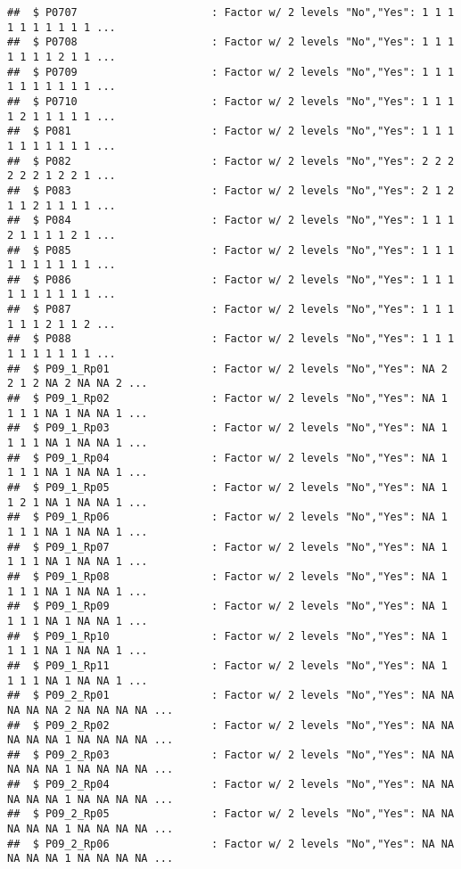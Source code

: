 \documentclass[
]{article}
\begin{document}
\begin{verbatim}
##  $ P0707                     : Factor w/ 2 levels "No","Yes": 1 1 1 1 1 1 1 1 1 1 ...
##  $ P0708                     : Factor w/ 2 levels "No","Yes": 1 1 1 1 1 1 1 2 1 1 ...
##  $ P0709                     : Factor w/ 2 levels "No","Yes": 1 1 1 1 1 1 1 1 1 1 ...
##  $ P0710                     : Factor w/ 2 levels "No","Yes": 1 1 1 1 2 1 1 1 1 1 ...
##  $ P081                      : Factor w/ 2 levels "No","Yes": 1 1 1 1 1 1 1 1 1 1 ...
##  $ P082                      : Factor w/ 2 levels "No","Yes": 2 2 2 2 2 2 1 2 2 1 ...
##  $ P083                      : Factor w/ 2 levels "No","Yes": 2 1 2 1 1 2 1 1 1 1 ...
##  $ P084                      : Factor w/ 2 levels "No","Yes": 1 1 1 2 1 1 1 1 2 1 ...
##  $ P085                      : Factor w/ 2 levels "No","Yes": 1 1 1 1 1 1 1 1 1 1 ...
##  $ P086                      : Factor w/ 2 levels "No","Yes": 1 1 1 1 1 1 1 1 1 1 ...
##  $ P087                      : Factor w/ 2 levels "No","Yes": 1 1 1 1 1 1 2 1 1 2 ...
##  $ P088                      : Factor w/ 2 levels "No","Yes": 1 1 1 1 1 1 1 1 1 1 ...
##  $ P09_1_Rp01                : Factor w/ 2 levels "No","Yes": NA 2 2 1 2 NA 2 NA NA 2 ...
##  $ P09_1_Rp02                : Factor w/ 2 levels "No","Yes": NA 1 1 1 1 NA 1 NA NA 1 ...
##  $ P09_1_Rp03                : Factor w/ 2 levels "No","Yes": NA 1 1 1 1 NA 1 NA NA 1 ...
##  $ P09_1_Rp04                : Factor w/ 2 levels "No","Yes": NA 1 1 1 1 NA 1 NA NA 1 ...
##  $ P09_1_Rp05                : Factor w/ 2 levels "No","Yes": NA 1 1 2 1 NA 1 NA NA 1 ...
##  $ P09_1_Rp06                : Factor w/ 2 levels "No","Yes": NA 1 1 1 1 NA 1 NA NA 1 ...
##  $ P09_1_Rp07                : Factor w/ 2 levels "No","Yes": NA 1 1 1 1 NA 1 NA NA 1 ...
##  $ P09_1_Rp08                : Factor w/ 2 levels "No","Yes": NA 1 1 1 1 NA 1 NA NA 1 ...
##  $ P09_1_Rp09                : Factor w/ 2 levels "No","Yes": NA 1 1 1 1 NA 1 NA NA 1 ...
##  $ P09_1_Rp10                : Factor w/ 2 levels "No","Yes": NA 1 1 1 1 NA 1 NA NA 1 ...
##  $ P09_1_Rp11                : Factor w/ 2 levels "No","Yes": NA 1 1 1 1 NA 1 NA NA 1 ...
##  $ P09_2_Rp01                : Factor w/ 2 levels "No","Yes": NA NA NA NA NA 2 NA NA NA NA ...
##  $ P09_2_Rp02                : Factor w/ 2 levels "No","Yes": NA NA NA NA NA 1 NA NA NA NA ...
##  $ P09_2_Rp03                : Factor w/ 2 levels "No","Yes": NA NA NA NA NA 1 NA NA NA NA ...
##  $ P09_2_Rp04                : Factor w/ 2 levels "No","Yes": NA NA NA NA NA 1 NA NA NA NA ...
##  $ P09_2_Rp05                : Factor w/ 2 levels "No","Yes": NA NA NA NA NA 1 NA NA NA NA ...
##  $ P09_2_Rp06                : Factor w/ 2 levels "No","Yes": NA NA NA NA NA 1 NA NA NA NA ...

\end{verbatim}
\end{document}

